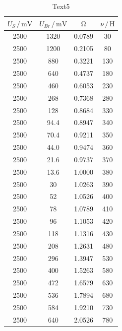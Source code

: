 \begin{table}[h]
\normalsize
\centering
{}
\begin{tabular}{c c c c}
\toprule
        $U_{S} \,/\,\si{\milli\volt}$ & $U_{Br} \,/\,\si{\milli\volt}$ & $\upOmega$ & $\nu \,/\, \si{\henry}$ \\
        \midrule
        2500 & 1320 &           0.0789 & 30 \\
        2500 & 1200 &           0.2105 & 80 \\
        2500 & 880 &            0.3221 & 130 \\
        2500 & 640 &            0.4737 & 180 \\
        2500 & 460 &            0.6053 & 230 \\
        2500 & 268 &            0.7368 & 280 \\
        2500 & 128 &            0.8684 & 330 \\
        2500 & 94.4 &           0.8947 & 340 \\
        2500 & 70.4 &           0.9211 & 350 \\
        2500 & 44.0 &           0.9474 & 360 \\
        2500 & 21.6 &           0.9737 & 370 \\
        2500 & 13.6 &           1.0000 & 380 \\   
        2500 & 30 &             1.0263 & 390 \\
        2500 & 52 &             1.0526 & 400 \\
        2500 & 78 &             1.0789 & 410 \\
        2500 & 96 &             1.1053 & 420 \\
        2500 & 118 &            1.1316 & 430 \\
        2500 & 208 &            1.2631 & 480 \\
        2500 & 296 &            1.3947 & 530 \\
        2500 & 400 &            1.5263 & 580 \\
        2500 & 472 &            1.6579 & 630 \\
        2500 & 536 &            1.7894 & 680 \\
        2500 & 584 &            1.9210 & 730 \\
        2500 & 640 &            2.0526 & 780 \\
        
\bottomrule
\end{tabular}
\caption{Text5} 
\label{tab:7}
\end{table}


